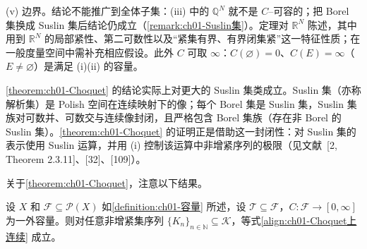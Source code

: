 \documentclass[../../main.tex]{subfiles}%
\begin{document}
\begin{remark}
(v) 边界。结论不能推广到全体子集：(iii) 中的 $\mathbb{Q}^N$ 就不是 $C$--可容的；把 Borel 集换成 Suslin 集后结论仍成立（\cref{remark:ch01-Suslin集}）。定理对 $\mathbb{R}^N$ 陈述，其中用到 $\mathbb{R}^N$ 的局部紧性、第二可数性以及“紧集有界、有界闭集紧”这一特征性质；在一般度量空间中需补充相应假设。此外 $C$ 可取 $\infty$：$C(\varnothing)=0$、$C(E)=\infty$（$E\neq\varnothing$）是满足 (i)(ii) 的容量。
\end{remark}

\begin{remark}\label{remark:ch01-Suslin集}
\cref{theorem:ch01-Choquet} 的结论实际上对更大的 Suslin 集类成立。Suslin 集（亦称解析集）是 Polish 空间在连续映射下的像；每个 Borel 集是 Suslin 集，Suslin 集族对可数并、可数交与连续像封闭，且严格包含 Borel 集族（存在非 Borel 的 Suslin 集）。\cref{theorem:ch01-Choquet} 的证明正是借助这一封闭性：对 Suslin 集的表示使用 Suslin 运算，并用 (i) 控制该运算中非增紧序列的极限（见文献~[2, Theorem 2.3.11]、[32]、[109]）。
\end{remark}

关于\cref{theorem:ch01-Choquet}，注意以下结果。

\begin{proposition}\label{proposition:ch01-外容量上连续}\label{proposition:ch01-测度上连续}
设 $X$ 和 $\mathcal{F}\subseteq\mathcal{P}(X)$ 如\cref{definition:ch01-容量} 所述，设 $\mathcal{T}\subseteq\mathcal{F}$，$C:\mathcal{F}\to[0,\infty]$ 为一外容量。则对任意非增紧集序列 $\{K_n\}_{n\in\mathbb{N}}\subseteq\mathcal{K}$，等式\eqref{align:ch01-Choquet上连续} 成立。
\end{proposition}
\end{document}

